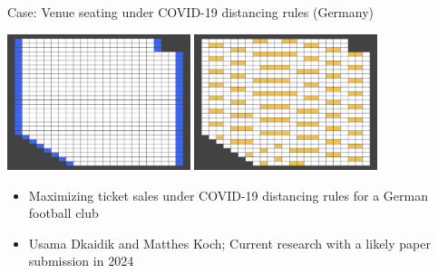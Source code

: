 \documentclass[aspectratio=1610,12pt]{beamer}
\begin{document}
\begin{frame}[fragile]{Case: Venue seating under COVID-19 distancing rules (Germany)}
  \begin{center}
      \includegraphics[width=0.40\textwidth]{images/stadium_empty.png}
      \quad
      \includegraphics[width=0.40\textwidth]{images/stadium_covid.png}
  \end{center}
    \begin{itemize}
         \item Maximizing ticket sales under COVID-19 distancing rules for a German football club
         \item Usama Dkaidik and Matthes Koch; Current research with a likely paper submission in 2024
    \end{itemize}
\end{frame}
\end{document}
